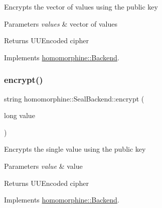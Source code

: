 Encrypts the vector of values using the public key


\begin{DoxyParams}{Parameters}
{\em values} & vector of values \\
\hline
\end{DoxyParams}
\begin{DoxyReturn}{Returns}
U\+U\+Encoded cipher 
\end{DoxyReturn}


Implements \mbox{\hyperlink{classhomomorphine_1_1_backend_ade5ea47921fae4c5117e11ed1097b7ce}{homomorphine\+::\+Backend}}.

\mbox{\label{classhomomorphine_1_1_seal_backend_af64a70096e488a75aadbd934cf73d482}} 
\subsubsection{\texorpdfstring{encrypt()}{encrypt()}\hspace{0.1cm}{\footnotesize\ttfamily [2/2]}}
{\footnotesize\ttfamily string homomorphine\+::\+Seal\+Backend\+::encrypt (\begin{DoxyParamCaption}\item[{long}]{value }\end{DoxyParamCaption})\hspace{0.3cm}{\ttfamily [virtual]}}

Encrypts the single value using the public key


\begin{DoxyParams}{Parameters}
{\em value} & value \\
\hline
\end{DoxyParams}
\begin{DoxyReturn}{Returns}
U\+U\+Encoded cipher 
\end{DoxyReturn}


Implements \mbox{\hyperlink{classhomomorphine_1_1_backend_a05ee154a7a5dd88a4a0589165fae9f97}{homomorphine\+::\+Backend}}.

\mbox{\label{classhomomorphine_1_1_seal_backend_a1e2ed46b896d4a5b5d930ec7bcd3207b}} 
